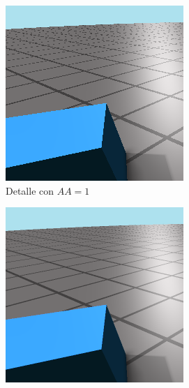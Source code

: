 \begin{figure}[htbp]
    \centering
    \begin{subfigure}[b]{0.3\textwidth}
        \centering
        \includegraphics[width=\textwidth]{Plantilla-TFG-master/img/aa1_zoom.png}
        \caption{Detalle con $AA = 1$}
        \label{subfig:noAA}
    \end{subfigure}
    \hfill
    \begin{subfigure}[b]{0.3\textwidth}
        \centering
        \includegraphics[width=\textwidth]{Plantilla-TFG-master/img/aa2_zoom.png}

\end{subfigure}
\end{figure}
